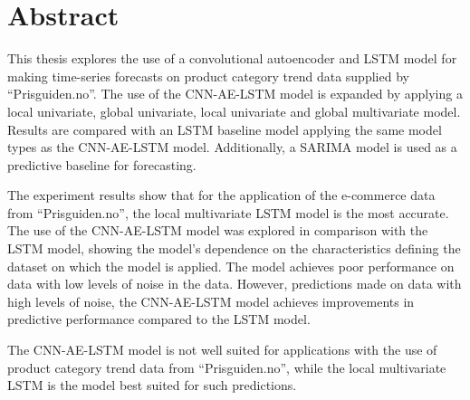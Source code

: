 \section*{Abstract}
\label{section:Abstract}





This thesis explores the use of a convolutional autoencoder and LSTM model for making time-series
forecasts on product category trend data supplied by ``Prisguiden.no''.
The use of the CNN-AE-LSTM model is expanded by applying a local univariate, global univariate, local univariate and global multivariate model.
Results are compared with an LSTM baseline model applying the same model types as the CNN-AE-LSTM model.
Additionally, a SARIMA model is used as a predictive baseline for forecasting.


The experiment results show that for the application of the e-commerce data from ``Prisguiden.no'',
the local multivariate LSTM model is the most accurate.
The use of the CNN-AE-LSTM model was explored in comparison with the LSTM model,
showing the model's dependence on the characteristics defining the dataset on which the model is applied.
The model achieves poor performance on data with low levels of noise in the data.
However, predictions made on data with high levels of noise, the CNN-AE-LSTM model achieves
improvements in predictive performance compared to the LSTM model.


The CNN-AE-LSTM model is not well suited for applications with the use of product category trend data from ``Prisguiden.no'',
while the local multivariate LSTM is the model best suited for such predictions.







